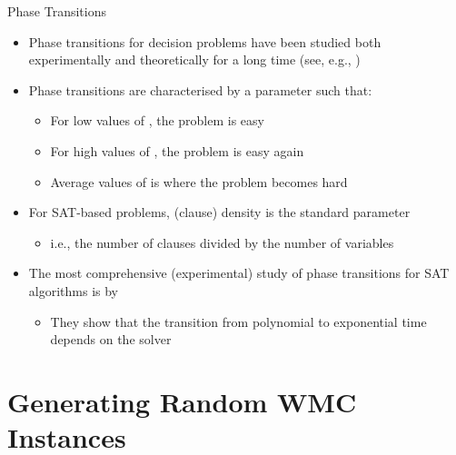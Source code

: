 \documentclass{beamer}
\begin{document}
\begin{frame}{Phase Transitions}
  \begin{itemize}
    \item Phase transitions for \alert{decision problems} have been studied both
          \alert{experimentally} and \alert{theoretically} for a long time (see,
          e.g.,
          \textcolor{gray}{\textcite{DBLP:conf/ijcai/CheesemanKT91}})\pause
    \item Phase transitions are characterised by a parameter 
          such that:
    \begin{itemize}
      \item For \alert{low} values of , the problem is
            \alert{easy}
      \item For \alert{high} values of , the problem is
            \alert{easy} again
      \item \alert{Average} values of  is where the problem
            becomes \alert{hard}\pause
    \end{itemize}
    \item For SAT-based problems, \alert{(clause) density} is the standard
          parameter
          \begin{itemize}
            \item i.e., the number of \alert{clauses} divided by the number of
                  \alert{variables}\pause
          \end{itemize}
    \item The most comprehensive (experimental) study of phase transitions for
          \alert{SAT algorithms} is
          by~\textcolor{gray}{\textcite{DBLP:journals/constraints/CoarfaDASV03}}
          \begin{itemize}
            \item They show that the transition from polynomial to exponential
                  time \alert{depends on the solver}
          \end{itemize}
  \end{itemize}
\end{frame}

\section{Generating Random WMC Instances}
\end{document}
